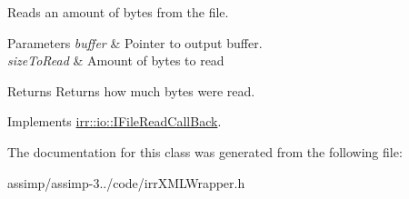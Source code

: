 Reads an amount of bytes from the file. 


\begin{DoxyParams}{Parameters}
{\em buffer} & Pointer to output buffer. \\
\hline
{\em size\+To\+Read} & Amount of bytes to read \\
\hline
\end{DoxyParams}
\begin{DoxyReturn}{Returns}
Returns how much bytes were read. 
\end{DoxyReturn}


Implements \hyperlink{classirr_1_1io_1_1_i_file_read_call_back_ae8c57b8454078aa2acd39772a6aa4439}{irr\+::io\+::\+I\+File\+Read\+Call\+Back}.



The documentation for this class was generated from the following file\+:\begin{DoxyCompactItemize}
\item 
assimp/assimp-\/3../code/irr\+X\+M\+L\+Wrapper.\+h\end{DoxyCompactItemize}
